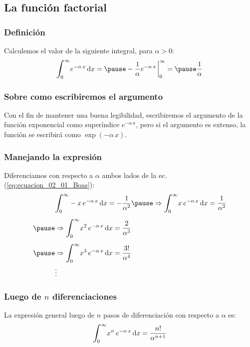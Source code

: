 \documentclass[12pt]{beamer}
\begin{document}
\subsection{La función factorial}

\begin{frame}
\frametitle{Definición}
Calculemos el valor de la siguiente integral, para $\alpha > 0$:
\pause
\begin{eqnarray}
\scaleint{6ex}_{\bs 0}^{\infty} e^{-\alpha \, x} \dd{x} = \pause - \dfrac{1}{\alpha} e^{-\alpha \, x}\eval_{0}^{\infty} = \pause \dfrac{1}{\alpha}
\label{eq:ecuacion_02_01_Boas}
\end{eqnarray}
\end{frame}
\begin{frame}
\frametitle{Sobre como escribiremos el argumento}
Con el fin de mantener una buena legibilidad, escribiremos el argumento de la función exponencial como superíndice $e^{-\alpha \, x}$, pero si el argumento es extenso, la función se escribirá como $\exp(-\alpha \, x)$.
\end{frame}
\begin{frame}
\frametitle{Manejando la expresión}
Diferenciamos con respecto a $\alpha$ ambos lados de la ec. (\ref{eq:ecuacion_02_01_Boas}):
\pause
\begin{eqnarray*}
\begin{aligned}
&\scaleint{6ex}_{\bs 0}^{\infty} - x \, e^{-\alpha \, x} \dd{x} = - \dfrac{1}{\alpha^{2}} \pause
\Rightarrow \scaleint{6ex}_{\bs 0}^{\infty} x \, e^{-\alpha \, x} \dd{x} = \dfrac{1}{\alpha^{2}} \\[0.5em] \pause
&\Rightarrow \scaleint{6ex}_{\bs 0}^{\infty} x^{2} \, e^{-\alpha \, x} \dd{x} = \dfrac{2}{\alpha^{3}} \\[0.5em] \pause
&\Rightarrow \scaleint{6ex}_{\bs 0}^{\infty} x^{3} \, e^{-\alpha \, x} \dd{x} = \dfrac{3!}{\alpha^{4}} \\
& \vdots
\end{aligned}
\end{eqnarray*}
\end{frame}
\begin{frame}
\frametitle{Luego de $n$ diferenciaciones}
La expresión general luego de $n$ pasos de diferenciación con respecto a $\alpha$ es:
\pause
\begin{align}
\scaleint{6ex}_{\bs 0}^{\infty} x^{n} \, e^{-\alpha \, x} \dd{x} = \dfrac{n!}{\alpha^{n+1}}
\label{eq:ecuacion_02_02}
\end{align}
\end{frame}
\end{document}
